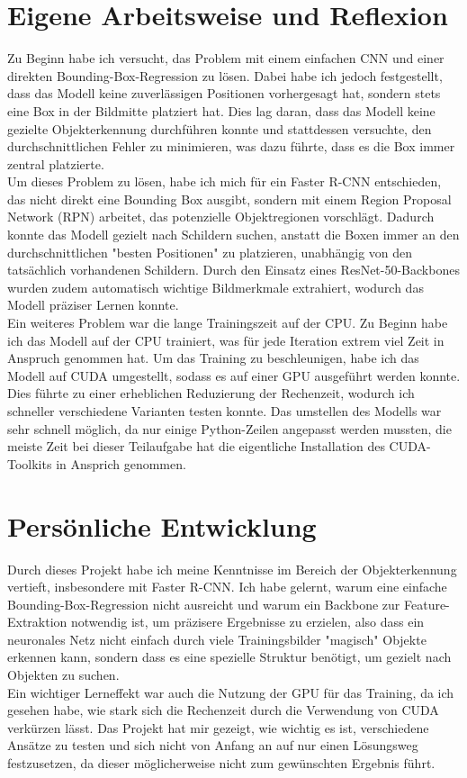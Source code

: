 \documentclass[runningheads]{llncs}
\begin{document}
\section{Eigene Arbeitsweise und Reflexion}
Zu Beginn habe ich versucht, das Problem mit einem einfachen CNN und einer direkten
Bounding-Box-Regression zu lösen. Dabei habe ich jedoch festgestellt, dass das Modell keine
zuverlässigen Positionen vorhergesagt hat, sondern stets eine Box in der Bildmitte platziert hat.
Dies lag daran, dass das Modell keine gezielte Objekterkennung durchführen konnte und stattdessen
versuchte, den durchschnittlichen Fehler zu minimieren, was dazu führte, dass es die Box immer
zentral platzierte.
\\
Um dieses Problem zu lösen, habe ich mich für ein Faster R-CNN entschieden, das nicht direkt eine
Bounding Box ausgibt, sondern mit einem Region Proposal Network (RPN) arbeitet, das potenzielle
Objektregionen vorschlägt. Dadurch konnte das Modell gezielt nach Schildern suchen, anstatt die
Boxen immer an den durchschnittlichen "besten Positionen" zu platzieren, unabhängig von den
tatsächlich vorhandenen Schildern. Durch den Einsatz eines ResNet-50-Backbones wurden zudem
automatisch wichtige Bildmerkmale extrahiert, wodurch das Modell präziser Lernen konnte.
\\
Ein weiteres Problem war die lange Trainingszeit auf der CPU. Zu Beginn habe ich das Modell auf der
CPU trainiert, was für jede Iteration extrem viel Zeit in Anspruch genommen hat.
Um das Training zu beschleunigen, habe ich das Modell auf CUDA umgestellt, sodass es auf einer GPU
ausgeführt werden konnte.
Dies führte zu einer erheblichen Reduzierung der Rechenzeit, wodurch ich schneller verschiedene
Varianten testen konnte.
Das umstellen des Modells war sehr schnell möglich, da nur einige Python-Zeilen angepasst werden
mussten, die meiste Zeit bei dieser Teilaufgabe hat die eigentliche Installation des CUDA-Toolkits
in Ansprich genommen.
\section{Persönliche Entwicklung}
Durch dieses Projekt habe ich meine Kenntnisse im Bereich der Objekterkennung vertieft, insbesondere
mit Faster R-CNN. Ich habe gelernt, warum eine einfache Bounding-Box-Regression nicht ausreicht
und warum ein Backbone zur Feature-Extraktion notwendig ist, um präzisere Ergebnisse zu erzielen,
also dass ein neuronales Netz nicht einfach durch viele Trainingsbilder "magisch" Objekte erkennen
kann, sondern dass es eine spezielle Struktur benötigt, um gezielt nach Objekten zu suchen.
\\
Ein wichtiger Lerneffekt war auch die Nutzung der GPU für das Training, da ich gesehen habe,
wie stark sich die Rechenzeit durch die Verwendung von CUDA verkürzen lässt.
Das Projekt hat mir gezeigt, wie wichtig es ist, verschiedene Ansätze zu testen und sich nicht von
Anfang an auf nur einen Lösungsweg festzusetzen, da dieser möglicherweise nicht zum gewünschten
Ergebnis führt.
\end{document}
